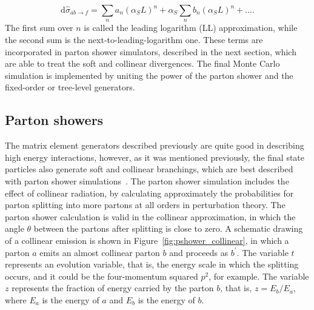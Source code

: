 \begin{equation}
\displaystyle
\textrm{d}\hat{\sigma}_{ab \rightarrow f} = \sum_n a_n (\alpha_S L)^n + \alpha_S \sum_n b_n(\alpha_S L)^n + \ldots.
\label{eq:sum}
\end{equation}
The first sum over $n$ is called the leading logarithm (LL) approximation, while the second sum is the next-to-leading-logarithm one. These terms are incorporated in parton
shower simulators, described in the next section, which are able to treat the soft and collinear divergences. The final Monte Carlo simulation is implemented
by uniting the power of the parton shower and the fixed-order or tree-level generators.

\subsection{Parton showers}
\label{subsec:parton_showers}

The matrix element generators described previously are quite good in describing high energy interactions, however, as it was mentioned
previously, the final state particles also
generate soft and collinear branchings, which are best described with parton shower simulations~\cite{lhc_event_gen}.
The parton shower simulation includes the effect
of collinear radiation, by calculating approximately the probabilities for parton splitting into more partons at all orders in perturbation theory.
The parton shower calculation is valid in the collinear approximation,
in which the angle $\theta$ between the partons after splitting is
close to zero.
A schematic drawing of a collinear emission is shown in Figure~\ref{fig:pshower_collinear}, in which a parton $a$ emits an almost collinear parton $b$ and proceeds as $b^\prime$.
The variable $t$ represents an evolution variable, that is, the energy scale in which the splitting occurs, and it could be the four-momentum squared $p^2$, for example.
The variable $z$ represents the fraction of energy carried by the parton $b$, that is, $z = E_b/E_a$, where $E_a$ is the energy of $a$ and $E_b$ is the energy of $b$.

